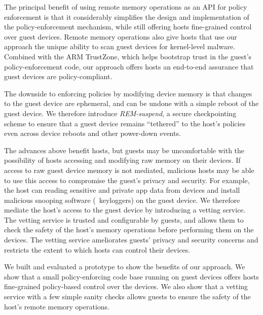 \begin{mylist}
The principal benefit of using remote memory operations as an API for policy
enforcement is that it considerably simplifies the design and implementation of
the policy-enforcement mechanism, while still offering hosts fine-grained
control over guest devices.  Remote memory operations also give hosts that use
our approach the unique ability to scan guest devices for kernel-level malware.
Combined with the ARM TrustZone, which helps bootstrap trust in the guest's
policy-enforcement code, our approach offers hosts an end-to-end assurance that
guest devices are policy-compliant.
%
\item {} The downside to enforcing
policies by modifying device memory is that changes to the guest device are
ephemeral, and can be undone with a simple reboot of the guest device. We
therefore introduce \textit{REM-suspend}, a secure checkpointing scheme to
ensure that a guest device remains ``tethered'' to the host's policies even
across device reboots and other power-down events.
%
\item {} The advances
above benefit hosts, but guests may be uncomfortable with the possibility of
hosts accessing and modifying raw memory on their devices. If access to raw
guest device memory is not mediated, malicious hosts may be able to use this
access to compromise the guest's privacy and security. For example, the host
can reading sensitive and private app data from devices and install malicious
snooping software (\eg~keyloggers) on the guest device.  We therefore mediate
the host's access to the guest device by introducing a vetting service. The
vetting service is trusted and configurable by guests, and allows them to check
the safety of the host's memory operations before performing them on the
devices.  The vetting service ameliorates guests' privacy and security concerns
and restricts the extent to which hosts can control their devices.
%
\end{mylist}

We built and evaluated a prototype to show the benefits of our approach. We
show that a small policy-enforcing code base running on guest devices offers
hosts fine-grained policy-based control over the devices. We also show that a
vetting service with a few simple sanity checks allows guests to ensure the
safety of the host's remote memory operations.
